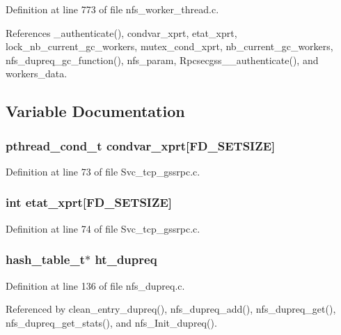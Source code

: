 Definition at line 773 of file nfs\_\-worker\_\-thread.c.

References \_\-authenticate(), condvar\_\-xprt, etat\_\-xprt, lock\_\-nb\_\-current\_\-gc\_\-workers, mutex\_\-cond\_\-xprt, nb\_\-current\_\-gc\_\-workers, nfs\_\-dupreq\_\-gc\_\-function(), nfs\_\-param, Rpcsecgss\_\-\_\-authenticate(), and workers\_\-data.

\subsection{Variable Documentation}
\subsubsection{\setlength{\rightskip}{0pt plus 5cm}pthread\_\-cond\_\-t {\bf condvar\_\-xprt}[FD\_\-SETSIZE]}\label{nfs__worker__thread_8c_a10}




Definition at line 73 of file Svc\_\-tcp\_\-gssrpc.c.
\subsubsection{\setlength{\rightskip}{0pt plus 5cm}int {\bf etat\_\-xprt}[FD\_\-SETSIZE]}\label{nfs__worker__thread_8c_a11}




Definition at line 74 of file Svc\_\-tcp\_\-gssrpc.c.
\subsubsection{\setlength{\rightskip}{0pt plus 5cm}hash\_\-table\_\-t$\ast$ {\bf ht\_\-dupreq}}\label{nfs__worker__thread_8c_a5}




Definition at line 136 of file nfs\_\-dupreq.c.

Referenced by clean\_\-entry\_\-dupreq(), nfs\_\-dupreq\_\-add(), nfs\_\-dupreq\_\-get(), nfs\_\-dupreq\_\-get\_\-stats(), and nfs\_\-Init\_\-dupreq().
